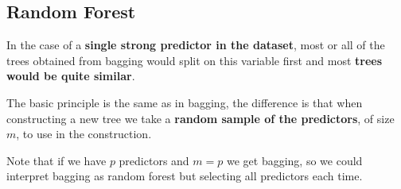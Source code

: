 \documentclass[aspectratio=169,10pt]{beamer}
\begin{document}
\subsection{Random Forest}
\begin{frame}{\secname}{\subsecname}
  In the case of a \textbf{single strong predictor in the dataset}, most or all of the trees obtained from bagging would split on this variable first and most \textbf{trees would be quite similar}.

  The basic principle is the same as in bagging, the difference is that when constructing a new tree we take a \textbf{random sample of the predictors}, of size $m$, to use in the construction.

  Note that if we have $p$ predictors and $m = p$ we get bagging, so we could interpret bagging as random forest but selecting all predictors each time.
\end{frame}
\end{document}
